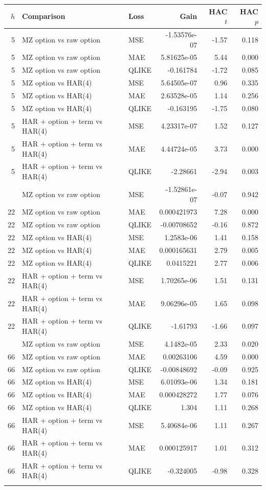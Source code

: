 \begin{tabular}{rllrrr}
\toprule
$h$ & Comparison & Loss & Gain & HAC $t$ & HAC $p$ \\
\midrule
5 & MZ option vs raw option & MSE & -1.53576e-07 & -1.57 & 0.118 \\
5 & MZ option vs raw option & MAE & 5.81625e-05 & 5.44 & 0.000 \\
5 & MZ option vs raw option & QLIKE & -0.161784 & -1.72 & 0.085 \\
5 & MZ option vs HAR(4) & MSE & 5.64505e-07 & 0.96 & 0.335 \\
5 & MZ option vs HAR(4) & MAE & 2.63528e-05 & 1.14 & 0.256 \\
5 & MZ option vs HAR(4) & QLIKE & -0.163195 & -1.75 & 0.080 \\
5 & HAR + option + term vs HAR(4) & MSE & 4.23317e-07 & 1.52 & 0.127 \\
5 & HAR + option + term vs HAR(4) & MAE & 4.44724e-05 & 3.73 & 0.000 \\
5 & HAR + option + term vs HAR(4) & QLIKE & -2.28661 & -2.94 & 0.003 \\
\addlinespace
22 & MZ option vs raw option & MSE & -1.52861e-07 & -0.07 & 0.942 \\
22 & MZ option vs raw option & MAE & 0.000421973 & 7.28 & 0.000 \\
22 & MZ option vs raw option & QLIKE & -0.00708652 & -0.16 & 0.872 \\
22 & MZ option vs HAR(4) & MSE & 1.2583e-06 & 1.41 & 0.158 \\
22 & MZ option vs HAR(4) & MAE & 0.000165631 & 2.79 & 0.005 \\
22 & MZ option vs HAR(4) & QLIKE & 0.0415221 & 2.77 & 0.006 \\
22 & HAR + option + term vs HAR(4) & MSE & 1.70265e-06 & 1.51 & 0.131 \\
22 & HAR + option + term vs HAR(4) & MAE & 9.06296e-05 & 1.65 & 0.098 \\
22 & HAR + option + term vs HAR(4) & QLIKE & -1.61793 & -1.66 & 0.097 \\
\addlinespace
66 & MZ option vs raw option & MSE & 4.1482e-05 & 2.33 & 0.020 \\
66 & MZ option vs raw option & MAE & 0.00263106 & 4.59 & 0.000 \\
66 & MZ option vs raw option & QLIKE & -0.00848692 & -0.09 & 0.925 \\
66 & MZ option vs HAR(4) & MSE & 6.01093e-06 & 1.34 & 0.181 \\
66 & MZ option vs HAR(4) & MAE & 0.000428272 & 1.77 & 0.076 \\
66 & MZ option vs HAR(4) & QLIKE & 1.304 & 1.11 & 0.268 \\
66 & HAR + option + term vs HAR(4) & MSE & 5.40684e-06 & 1.11 & 0.267 \\
66 & HAR + option + term vs HAR(4) & MAE & 0.000125917 & 1.01 & 0.312 \\
66 & HAR + option + term vs HAR(4) & QLIKE & -0.324005 & -0.98 & 0.328 \\
\addlinespace
\bottomrule
\end{tabular}
